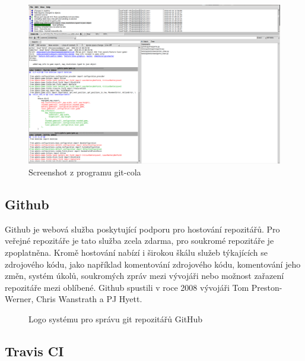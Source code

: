 \begin{figure}[bht]
	\centering
	\begin{minipage}{\textwidth}
 		\centering
 		\includegraphics[width=\textwidth]{assets/git-cola-screenshot}
 		\caption{Screenshot z programu git-cola}
 		\label{fig:git-cola}
 	\end{minipage}
\end{figure}

\subsection{Github}

Github je webová služba poskytující podporu pro hostování  repozitářů. Pro veřejné repozitáře je tato služba zcela zdarma, pro soukromé repozitáře je zpoplatněna. Kromě hostování nabízí i širokou škálu služeb týkajících se zdrojového kódu, jako například komentování zdrojového k\'{o}du, komentování jeho změn, systém úkolů, soukromých zpráv mezi vývojáři nebo možnost zařazení repozitáře mezi oblíbené. Github spustili v roce 2008 vývojáři Tom Preston-Werner, Chris Wanstrath a PJ Hyett.

\begin{figure}[bht]
 	\centering
 	
 	\caption{Logo systému pro správu git repozitářů GitHub}
\end{figure}

\subsection{Travis CI}

